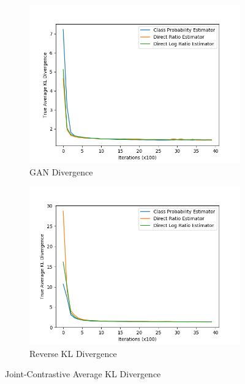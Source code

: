 \documentclass[honours,12pt]{unswthesis}
\numberwithin{equation}{section}
\theoremstyle{definition}
\begin{document}
\begin{figure}
\begin{subfigure}{0.49\textwidth}
\includegraphics[width=\linewidth]{part2truklmins/JCADVvsJCADVexpvsJCADVgudlog.png}
\caption{GAN Divergence}
\end{subfigure}
\begin{subfigure}{0.49\textwidth}
\includegraphics[width=\linewidth]{part2truklmins/JCKLDvsJCKLexpvsJCKLgudlog.png}
\caption{Reverse KL Divergence}
\end{subfigure}
\caption{Joint-Contrastive Average KL Divergence}
\end{figure}
\end{document}
